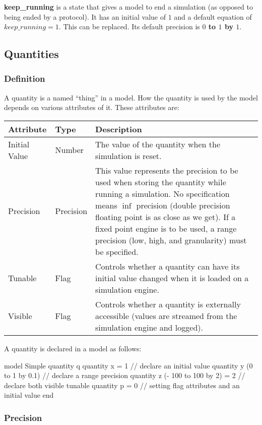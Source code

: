 \documentclass[11pt]{article}
\begin{document}
{\bf keep\_running} is a state that gives a model to end a simulation
(as opposed to being ended by a protocol).  It has an initial value of
$1$ and a default equation of $keep\_running = 1$.  This can be
replaced.  Its default precision is {\bf $0$ to $1$ by $1$}.

\subsection{Quantities}
\subsubsection{Definition}
A quantity is a named ``thing'' in a model.  How the quantity is used
by the model depends on various attributes of it.  These attributes are:

\begin{center}
\begin{tabular}{|l|l|p{3.5in}|}
\hline
Attribute & Type & Description\\
\hline
Initial Value & Number & The value of the quantity when the simulation is reset. \\
\hline
Precision & Precision & This value represents the precision to be used when storing the quantity while running a simulation.  No specification means $\inf$ precision (double precision floating point is as close as we get).  If a fixed point engine is to be used, a range precision (low, high, and granularity) must be specified.\\
\hline
Tunable & Flag & Controls whether a quantity can have its initial value changed when it is loaded on a simulation engine.\\
\hline
 Visible & Flag & Controls whether a quantity is externally accessible (values are streamed from the simulation engine and logged).\\
\hline
\end{tabular}
\end{center}

A quantity is declared in a model as follows:

\begin{dsl}
model Simple
  quantity q
  quantity x = 1 // declare an initial value
  quantity y (0 to 1 by 0.1) // declare a range precision
  quantity z (- 100 to 100 by 2) = 2 // declare both
  visible tunable quantity p = 0 // setting flag attributes and an initial value
end
\end{dsl}

\subsubsection{Precision}
\end{document}
